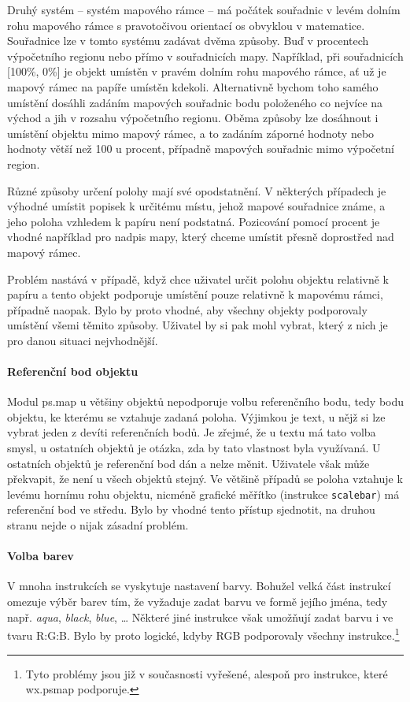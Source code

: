 \documentclass[a4paper,12pt,draft]{article}
\newcommand{\instr}[1]{\lstinline[style=psmapInline]|#1|}
\begin{document}
{Druhý systém -- systém mapového rámce -- má počátek souřadnic v
levém dolním rohu mapového rámce s pravotočivou orientací os obvyklou v
matematice. Souřadnice lze v tomto systému zadávat dvěma způsoby. Buď
v procentech výpočetního regionu nebo přímo v souřadnicích
mapy. Například, při souřadnicích [100\%, 0\%] je objekt umístěn v
pravém dolním rohu mapového rámce, ať už je mapový rámec na papíře
umístěn kdekoli. Alternativně bychom toho samého umístění dosáhli
zadáním mapových souřadnic bodu položeného co nejvíce na východ
a jih v rozsahu výpočetního regionu. Oběma způsoby lze dosáhnout i
umístění objektu mimo mapový rámec, a to zadáním záporné hodnoty
nebo hodnoty větší než 100 u procent, případně mapových souřadnic
mimo výpočetní region.

Různé způsoby určení polohy mají své opodstatnění. V některých
případech je výhodné umístit popisek k určitému místu, jehož
mapové souřadnice známe, a jeho poloha vzhledem k papíru není
podstatná. Pozicování pomocí procent je vhodné například pro nadpis
mapy, který chceme umístit přesně doprostřed nad mapový rámec.

Problém nastává v případě, když chce uživatel určit polohu objektu
relativně k papíru a tento objekt podporuje umístění pouze relativně
k mapovému rámci, případně naopak. Bylo by proto vhodné, aby všechny
objekty podporovaly umístění všemi těmito způsoby. Uživatel by si
pak mohl vybrat, který z nich je pro danou situaci nejvhodnější.

\paragraph*{Referenční bod objektu}
\label{sec:psmap:referencepoint}
Modul ps.map u většiny objektů nepodporuje volbu referenčního
bodu, tedy bodu objektu, ke kterému se vztahuje zadaná poloha. Výjimkou
je text, u nějž si lze vybrat jeden z devíti referenčních bodů. Je
zřejmé, že u textu má tato volba smysl, u ostatních objektů je otázka,
zda by tato vlastnost byla využívaná.
U ostatních objektů je referenční bod dán a nelze měnit. Uživatele
však může překvapit, že není u všech objektů stejný. Ve většině
případů se poloha vztahuje k levému hornímu rohu objektu, nicméně
grafické měřítko (instrukce \instr{scalebar}) má referenční bod ve
středu. Bylo by vhodné tento přístup sjednotit, na druhou stranu nejde
o nijak zásadní problém.

\paragraph*{Volba barev}
\label{sec:psmap:color}
V mnoha instrukcích se vyskytuje nastavení barvy. Bohužel velká část
instrukcí omezuje výběr barev tím, že vyžaduje zadat barvu ve formě
jejího jména, tedy např. \emph{aqua}, \emph{black}, \emph{blue}, \ldots
Některé jiné instrukce však umožňují zadat barvu i ve tvaru R:G:B. Bylo
by proto logické, kdyby RGB podporovaly všechny instrukce.\footnote{Tyto
problémy jsou již v současnosti vyřešené, alespoň pro instrukce,
které wx.psmap podporuje.}

}
\end{document}
